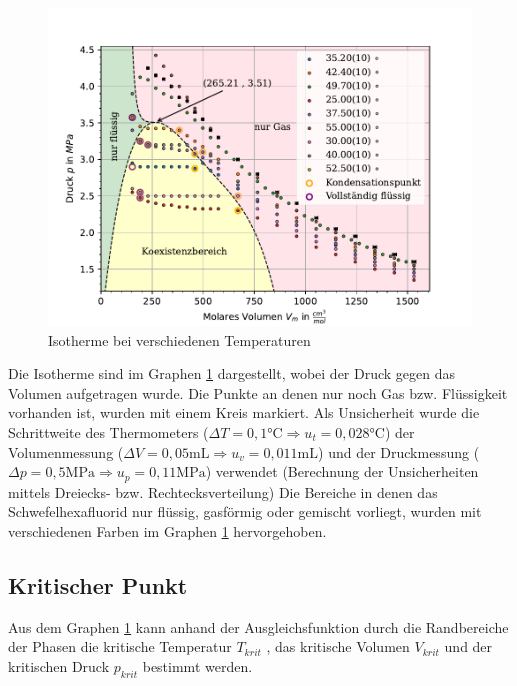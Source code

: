 \documentclass[11pt, a4paper]{article}
\begin{document}
    \begin{figure}
        \centering
        \includegraphics[width=\textwidth]{./Plots/4Plot_of_Hell.pdf}

        \caption{Isotherme bei verschiedenen Temperaturen}
        \label{fig:isotherme}
    \end{figure}
    Die Isotherme sind im Graphen \ref{fig:isotherme} dargestellt, wobei der Druck gegen das Volumen aufgetragen wurde.
    Die Punkte an denen nur noch Gas bzw. Flüssigkeit vorhanden ist, wurden mit einem Kreis markiert. Als
    Unsicherheit wurde die Schrittweite des Thermometers ($\Delta T = 0,1 \si{\celsius} \Rightarrow u_t = 0,028 \si{\celsius}$)
    der Volumenmessung ($\Delta V = 0,05 \si{\milli\liter} \Rightarrow u_v = 0,011 \si{\milli\liter}$) und der Druckmessung
    ($\Delta p = 0,5 \si{\mega\pascal} \Rightarrow u_p = 0,11 \si{\mega\pascal}$) verwendet (Berechnung der Unsicherheiten 	mittels Dreiecks- bzw. Rechtecksverteilung)
    Die Bereiche in denen das Schwefelhexafluorid nur flüssig, gasförmig oder gemischt vorliegt, wurden mit verschiedenen
    Farben im Graphen \ref{fig:isotherme} hervorgehoben.

    \subsection{Kritischer Punkt}

    Aus dem Graphen \ref{fig:isotherme} kann anhand der Ausgleichsfunktion durch die Randbereiche der Phasen
    die kritische Temperatur $T_{krit}$ , das kritische Volumen $V_{krit}$ und der kritischen Druck $p_{krit}$ bestimmt werden.
    
\end{document}
